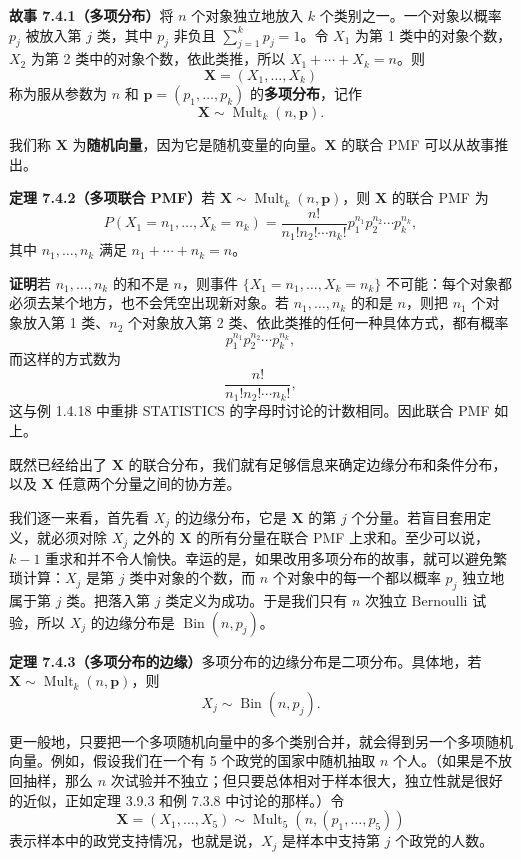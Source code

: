 \documentclass[UTF8,12pt,a4paper,fontset=fandol]{ctexart}
\begin{document}
\noindent\textbf{故事 7.4.1（多项分布）}\quad 将 $n$ 个对象独立地放入 $k$ 个类别之一。一个对象以概率 $p_j$ 被放入第 $j$ 类，其中 $p_j$ 非负且 $\sum_{j=1}^{k}p_j=1$。令 $X_1$ 为第 1 类中的对象个数，$X_2$ 为第 2 类中的对象个数，依此类推，所以 $X_1+\cdots+X_k=n$。则
\[
  \mathbf{X}=(X_1,\ldots,X_k)
\]
称为服从参数为 $n$ 和 $\mathbf{p}=(p_1,\ldots,p_k)$ 的\textbf{多项分布}，记作
\[
  \mathbf{X}\sim \operatorname{Mult}_k(n,\mathbf{p}).
\]

我们称 $\mathbf{X}$ 为\textbf{随机向量}，因为它是随机变量的向量。$\mathbf{X}$ 的联合 PMF 可以从故事推出。

\noindent\textbf{定理 7.4.2（多项联合 PMF）}\quad 若 $\mathbf{X}\sim \operatorname{Mult}_k(n,\mathbf{p})$，则 $\mathbf{X}$ 的联合 PMF 为
\[
  P(X_1=n_1,\ldots,X_k=n_k)
  =\frac{n!}{n_1!n_2!\cdots n_k!}p_1^{n_1}p_2^{n_2}\cdots p_k^{n_k},
\]
其中 $n_1,\ldots,n_k$ 满足 $n_1+\cdots+n_k=n$。

\noindent\textbf{证明}\quad 若 $n_1,\ldots,n_k$ 的和不是 $n$，则事件 $\{X_1=n_1,\ldots,X_k=n_k\}$ 不可能：每个对象都必须去某个地方，也不会凭空出现新对象。若 $n_1,\ldots,n_k$ 的和是 $n$，则把 $n_1$ 个对象放入第 1 类、$n_2$ 个对象放入第 2 类、依此类推的任何一种具体方式，都有概率
\[
  p_1^{n_1}p_2^{n_2}\cdots p_k^{n_k},
\]
而这样的方式数为
\[
  \frac{n!}{n_1!n_2!\cdots n_k!},
\]
这与例 1.4.18 中重排 STATISTICS 的字母时讨论的计数相同。因此联合 PMF 如上。

既然已经给出了 $\mathbf{X}$ 的联合分布，我们就有足够信息来确定边缘分布和条件分布，以及 $\mathbf{X}$ 任意两个分量之间的协方差。

我们逐一来看，首先看 $X_j$ 的边缘分布，它是 $\mathbf{X}$ 的第 $j$ 个分量。若盲目套用定义，就必须对除 $X_j$ 之外的 $\mathbf{X}$ 的所有分量在联合 PMF 上求和。至少可以说，$k-1$ 重求和并不令人愉快。幸运的是，如果改用多项分布的故事，就可以避免繁琐计算：$X_j$ 是第 $j$ 类中对象的个数，而 $n$ 个对象中的每一个都以概率 $p_j$ 独立地属于第 $j$ 类。把落入第 $j$ 类定义为成功。于是我们只有 $n$ 次独立 Bernoulli 试验，所以 $X_j$ 的边缘分布是 $\operatorname{Bin}(n,p_j)$。

\noindent\textbf{定理 7.4.3（多项分布的边缘）}\quad 多项分布的边缘分布是二项分布。具体地，若 $\mathbf{X}\sim \operatorname{Mult}_k(n,\mathbf{p})$，则
\[
  X_j\sim \operatorname{Bin}(n,p_j).
\]

更一般地，只要把一个多项随机向量中的多个类别合并，就会得到另一个多项随机向量。例如，假设我们在一个有 5 个政党的国家中随机抽取 $n$ 个人。（如果是不放回抽样，那么 $n$ 次试验并不独立；但只要总体相对于样本很大，独立性就是很好的近似，正如定理 3.9.3 和例 7.3.8 中讨论的那样。）令
\[
  \mathbf{X}=(X_1,\ldots,X_5)\sim \operatorname{Mult}_5(n,(p_1,\ldots,p_5))
\]
表示样本中的政党支持情况，也就是说，$X_j$ 是样本中支持第 $j$ 个政党的人数。
\end{document}
